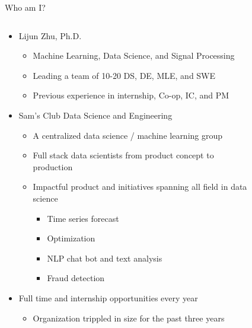 \documentclass[aspectratio=169,xcolor=x11names,table]{beamer}
\begin{document}
\begin{frame}{Who am I?}
	\begin{columns}
		\begin{column}{0.8\linewidth}
		\begin{itemize}
			\item Lijun Zhu, Ph.D.
				\begin{itemize}
					\item Machine Learning, Data Science, and Signal Processing
					\item Leading a team of 10-20 DS, DE, MLE, and SWE
					\item Previous experience in internship, Co-op, IC, and PM
				\end{itemize}
			\item Sam's Club Data Science and Engineering
				\begin{itemize}
					\item A centralized data science / machine learning group
					\item Full stack data scientists from product concept to production
					\item Impactful product and initiatives spanning all field in data science
						\begin{itemize}
							\item Time series forecast
							\item Optimization
							\item NLP chat bot and text analysis
							\item Fraud detection
						\end{itemize}
				\end{itemize}
			\item Full time and internship opportunities every year
				\begin{itemize}
					\item Organization trippled in size for the past three years
				\end{itemize}
		\end{itemize}
		\end{column}
		\hfill
		\begin{column}{0.2\linewidth}
			\begin{figure}
				\centering

\end{figure}
\end{column}
\end{columns}
\end{frame}
\end{document}
